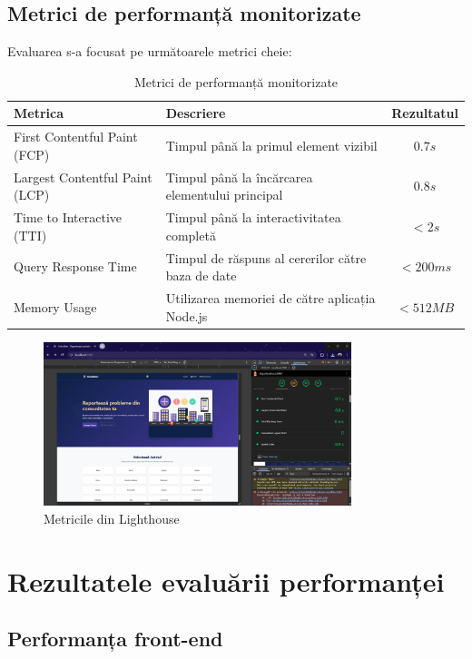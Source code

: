 \documentclass[12pt,a4paper]{report}
\begin{document}
\subsection{Metrici de performanță monitorizate}

Evaluarea s-a focusat pe următoarele metrici cheie:

\begin{table}[H]
\centering
\caption{Metrici de performanță monitorizate}
\label{tab:performance_metrics}
\begin{tabular}{|l|p{7cm}|c|}
\hline
\textbf{Metrica} & \textbf{Descriere} & \textbf{Rezultatul} \\
\hline
First Contentful Paint (FCP) & Timpul până la primul element vizibil & $0.7s$ \\
\hline
Largest Contentful Paint (LCP) & Timpul până la încărcarea elementului principal & $0.8s$ \\
\hline
Time to Interactive (TTI) & Timpul până la interactivitatea completă & $< 2s$ \\
\hline
Query Response Time & Timpul de răspuns al cererilor către baza de date & $< 200ms$ \\
\hline
Memory Usage & Utilizarea memoriei de către aplicația Node.js & $< 512MB$ \\
\hline
\end{tabular}
\end{table}

\begin{figure}[H]
    \centering
    \includegraphics[width=0.8\textwidth]{metrics.png}
    \caption{Metricile din Lighthouse}
    \label{fig:metrics}
\end{figure}

\section{Rezultatele evaluării performanței}

\subsection{Performanța front-end}
\end{document}

